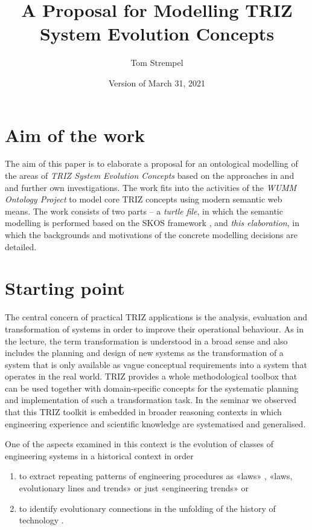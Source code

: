 \documentclass[11pt,a4paper]{article}
\title{A Proposal for Modelling TRIZ System Evolution Concepts}
\author{Tom Strempel}
\date{Version of March 31, 2021}
\begin{document}
\maketitle

\section{Aim of the work}

The aim of this paper is to elaborate a proposal for an ontological modelling
of the areas of \emph{TRIZ System Evolution Concepts} based on the approaches
in \cite{TESE2018} and \cite{Shpakovsky2016} and further own investigations.
The work fits into the activities of the \emph{WUMM Ontology Project}
\cite{WUMM} to model core TRIZ concepts using modern semantic web means.  The
work consists of two parts -- a \emph{turtle file}, in which the semantic
modelling is performed based on the SKOS framework \cite{SKOS}, and \emph{this
  elaboration}, in which the backgrounds and motivations of the concrete
modelling decisions are detailed.

\section{Starting point} 

The central concern of practical TRIZ applications is the analysis, evaluation
and transformation of systems in order to improve their operational behaviour.
As in the lecture, the term transformation is understood in a broad sense and
also includes the planning and design of new systems as the transformation of
a system that is only available as vague conceptual requirements into a system
that operates in the real world. TRIZ provides a whole methodological toolbox
that can be used together with domain-specific concepts for the systematic
planning and implementation of such a transformation task. In the seminar we
observed that this TRIZ toolkit is embedded in broader reasoning contexts in
which engineering experience and scientific knowledge are systematised and
generalised.

One of the aspects examined in this context is the evolution of classes of
engineering systems in a historical context in order 
\begin{enumerate}
\item to extract repeating patterns of engineering procedures as «laws»
  \cite{Altshuller1979}, «laws, evolutionary lines and trends» \cite{KS} or
  just «engineering trends» \cite{TESE2018} or
\item to identify evolutionary connections in the unfolding of the history of
  technology \cite{Shpakovsky2016}.
\end{enumerate}
\end{document}
